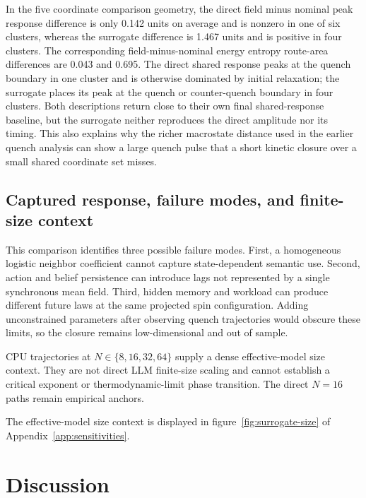 \documentclass[12pt]{article}
\begin{document}
In the five coordinate comparison geometry, the direct field minus nominal
peak response difference is only 0.142 units on average and is nonzero in one
of six clusters, whereas the surrogate difference is 1.467 units and is
positive in four clusters.  The corresponding field-minus-nominal
energy entropy route-area differences are 0.043 and 0.695.  The direct shared
response peaks at the quench boundary in one cluster and is otherwise dominated
by initial relaxation; the surrogate places its peak at the quench or
counter-quench boundary in four clusters.  Both descriptions return close to
their own final shared-response baseline, but the surrogate neither reproduces
the direct amplitude nor its timing.  This also explains why the richer
macrostate distance used in the earlier quench analysis can show a large quench pulse that a short kinetic closure
over a small shared coordinate set misses.




\subsection{Captured response, failure modes, and finite-size context}
\label{sec:closure-limits}

This comparison identifies three possible failure modes.  First, a homogeneous
logistic neighbor coefficient cannot capture state-dependent semantic use.
Second, action and belief persistence can introduce lags not represented by a
single synchronous mean field.  Third, hidden memory and workload can produce
different future laws at the same projected spin configuration.  Adding
unconstrained parameters after observing quench trajectories would obscure
these limits, so the closure remains low-dimensional and out of sample.

CPU trajectories at $N\in\{8,16,32,64\}$ supply a dense effective-model size
context.  They are not direct LLM finite-size scaling and cannot establish a
critical exponent or thermodynamic-limit phase transition.  The direct
$N=16$ paths remain empirical anchors.

The effective-model size context is displayed in figure~\ref{fig:surrogate-size}
of Appendix~\ref{app:sensitivities}.




\section{Discussion}
\label{sec:discussion}
\end{document}
